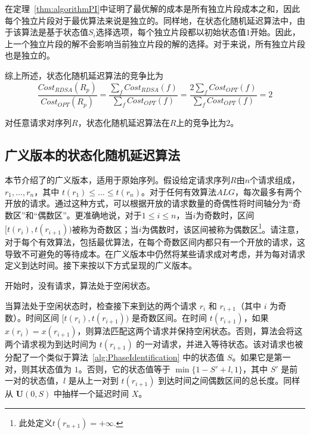在定理~\ref{thm:algorithmPI}中证明了最优解的成本是所有独立片段成本之和，因此每个独立片段对于最优算法来说是独立的。同样地，在状态化随机延迟算法中，由于该算法是基于状态值$S_i$选择选项，每个独立片段都以初始状态值$1$开始。因此，上一个独立片段的解不会影响当前独立片段的解的选择。对于\ralgo 来说，所有独立片段也是独立的。

综上所述，状态化随机延迟算法的竞争比为
\begin{equation} \label{eq:cost_ratio}
\frac{Cost_{RDSA}(R_p)}{Cost_{OPT}(R_p)} = \frac{\sum_{f}Cost_{RDSA}(f)}{\sum_{f}Cost_{OPT}(f)} =
\frac{2\sum_{f}Cost_{OPT}(f)}{\sum_{f}Cost_{OPT}(f)} = 2    
\end{equation}

\begin{corollary}
    \label{cor:2-competitive}
    对任意请求对序列$R$，状态化随机延迟算法\ralgo 在$R$上的竞争比为$2$。
\end{corollary}

\subsection{广义版本的状态化随机延迟算法\ralgo}\label{subsec:generalization}
本节介绍了\ralgo 的广义版本，适用于原始序列。假设给定请求序列$R$由$n$个请求组成，$r_1, \ldots, r_n$，其中 $t(r_1) \leq \ldots \leq t(r_n)$。对于任何有效算法$ALG$，每次最多有两个开放的请求。通过这种方式，可以根据开放的请求数量的奇偶性将时间轴分为“奇数区”和“偶数区”。更准确地说，对于$1\leq i \leq n$，当$i$为奇数时，区间$[t(r_i), t(r_{i+1}))$被称为奇数区；当$i$为偶数时，该区间被称为偶数区\footnote{此处定义$t(r_{n+1})=+\infty.$}。请注意，对于每个有效算法，包括最优算法，在每个奇数区间内都只有一个开放的请求，这导致不可避免的等待成本。在广义版本中仍然将某些请求成对考虑，并为每对请求定义到达时间。接下来按以下方式呈现\ralgo 的广义版本。

开始时，没有请求，算法处于空闲状态。

当算法处于空闲状态时，检查接下来到达的两个请求 $r_i$ 和 $r_{i+1}$（其中 $i$ 为奇数）。时间区间 $[t(r_i), t(r_{i+1}))$ 是奇数区间。在时间 $t(r_{i+1})$，如果 $x(r_i)=x(r_{i+1})$，则算法匹配这两个请求并保持空闲状态。否则，算法会将这两个请求视为到达时间为 $t(r_{i+1})$ 的一对请求，并进入等待状态。该对请求也被分配了一个类似于算法~\ref{alg:PhaseIdentification} 中的状态值 $S$。如果它是第一对，则其状态值为 $1$。否则，它的状态值等于 $\min\{1-S'+l,1\}$，其中 $S'$ 是前一对的状态值，$l$ 是从上一对到 $t(r_{i+1})$ 到达时间之间偶数区间的总长度。同样从 $\mathbf{U}(0,S)$ 中抽样一个延迟时间 $X$。

